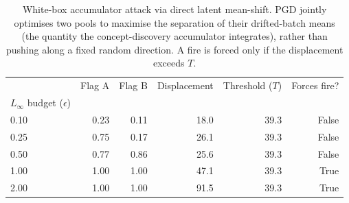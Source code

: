 \begin{table}
\caption{White-box accumulator attack via direct latent mean-shift. PGD jointly optimises two pools to maximise the separation of their drifted-batch means (the quantity the concept-discovery accumulator integrates), rather than pushing along a fixed random direction. A fire is forced only if the displacement exceeds $T$.}
\label{tab:rq3-pgd-meanshift}
\centering
\begin{tabular}{lrrrrr}
\toprule
 & Flag A & Flag B & Displacement & Threshold ($T$) & Forces fire? \\
$L_\infty$ budget ($\epsilon$) &  &  &  &  &  \\
\midrule
0.10 & 0.23 & 0.11 & 18.0 & 39.3 & False \\
0.25 & 0.75 & 0.17 & 26.1 & 39.3 & False \\
0.50 & 0.77 & 0.86 & 25.6 & 39.3 & False \\
1.00 & 1.00 & 1.00 & 47.1 & 39.3 & True \\
2.00 & 1.00 & 1.00 & 91.5 & 39.3 & True \\
\bottomrule
\end{tabular}
\end{table}
